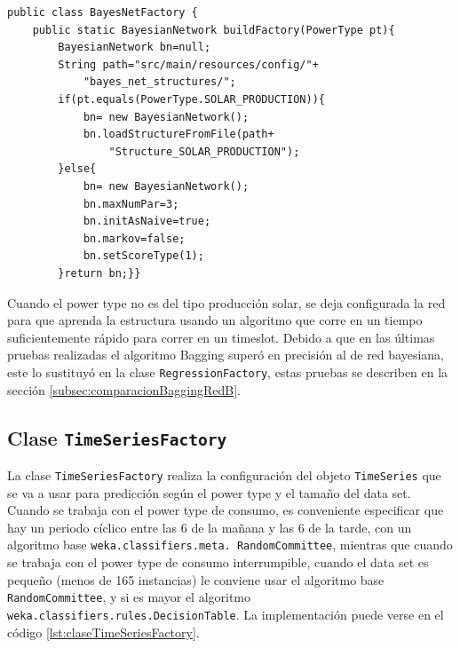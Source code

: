 
\begin{lstlisting}[frame=single]  
public class BayesNetFactory {
	public static BayesianNetwork buildFactory(PowerType pt){
		BayesianNetwork bn=null;
		String path="src/main/resources/config/"+
			"bayes_net_structures/";
		if(pt.equals(PowerType.SOLAR_PRODUCTION)){
			bn= new BayesianNetwork();
			bn.loadStructureFromFile(path+
				"Structure_SOLAR_PRODUCTION");
		}else{
			bn= new BayesianNetwork(); 
			bn.maxNumPar=3;
			bn.initAsNaive=true;
			bn.markov=false;
			bn.setScoreType(1);
		}return bn;}}
\end{lstlisting}
Cuando el power type no es del tipo producción solar, se deja configurada la red para que aprenda la estructura usando un algoritmo que corre en un tiempo suficientemente rápido para correr en un timeslot. Debido a que en las últimas pruebas realizadas el algoritmo Bagging superó en precisión al de red bayesiana, este lo sustituyó en la clase \texttt{RegressionFactory}, estas pruebas se describen en la sección \ref{subsec:comparacionBaggingRedB}.

\subsection{Clase \texttt{TimeSeriesFactory}} \label{subsec:claseTimeSeriesFactory}
La clase \texttt{TimeSeriesFactory} realiza la configuración del objeto \texttt{TimeSeries} que se va a usar para predicción según el power type y el tamaño del data set. Cuando se trabaja con el power type de consumo, es conveniente especificar que hay un periodo cíclico entre las 6 de la mañana y las 6 de la tarde, con un algoritmo base \texttt{weka.classifiers.meta. RandomCommittee}, mientras que cuando se trabaja con el power type de consumo interrumpible, cuando el data set es pequeño (menos de 165 instancias) le conviene usar el algoritmo base \texttt{RandomCommittee}, y si es mayor el algoritmo \texttt{weka.classifiers.rules.DecisionTable}. La implementación puede verse en el código \ref{lst:claseTimeSeriesFactory}.



